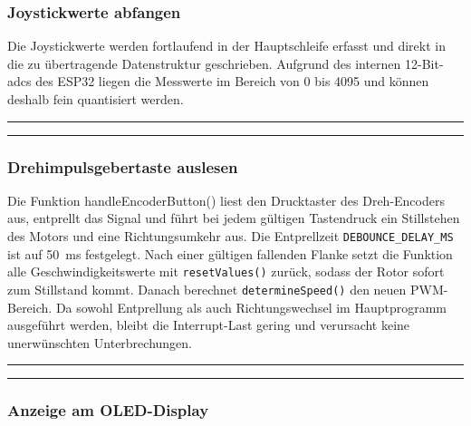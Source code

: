 \documentclass[a4paper,12pt]{article}
\begin{document}
\subsubsection{Joystickwerte abfangen}
\label{sec:Joystickwerte abfangen}

Die Joystickwerte werden fortlaufend in der Hauptschleife erfasst und direkt in die zu übertragende Datenstruktur geschrieben. Aufgrund des internen 12-Bit-\gls{adc}s des ESP32 liegen die Messwerte im Bereich von 0 bis 4095 und können deshalb fein quantisiert werden.
\newline\noindent\rule{\linewidth}{0.4pt}  %

\noindent\rule{\linewidth}{0.4pt}  %



\subsubsection{Drehimpulsgebertaste auslesen}
\label{sec:Drehimpulsgebertaste auslesen}

Die Funktion handleEncoderButton() liest den Drucktaster des Dreh-Encoders aus, entprellt das Signal und führt bei jedem gültigen Tastendruck ein Stillstehen des Motors und eine Richtungsumkehr aus. Die Entprellzeit \texttt{DEBOUNCE\_DELAY\_MS} ist auf \SI{50}{\milli\second} festgelegt. Nach einer gültigen fallenden Flanke setzt die Funktion alle Geschwindigkeitswerte mit \texttt{resetValues()} zurück, sodass der Rotor sofort zum Stillstand kommt. Danach berechnet \texttt{determineSpeed()} den neuen PWM-Bereich. Da sowohl Entprellung als auch Richtungswechsel im Hauptprogramm ausgeführt werden, bleibt die Interrupt-Last gering und verursacht keine unerwünschten Unterbrechungen.


\noindent\rule{\linewidth}{0.4pt}  %

\noindent\rule{\linewidth}{0.4pt}  %


\subsubsection{Anzeige am OLED-Display}
\label{sec:Anzeige am OLED-Display}
\end{document}
